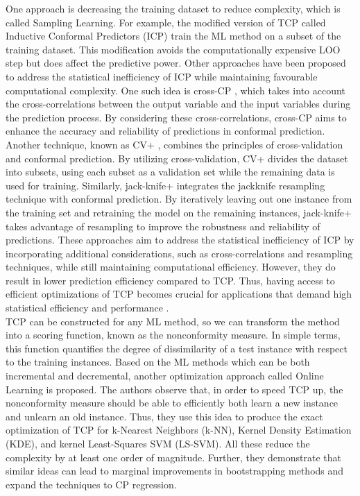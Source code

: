 \documentclass[10pt]{reportMaster}
\begin{document}
\noindent One approach is decreasing the training dataset to reduce complexity, which is called Sampling Learning. For example, the modified version of TCP called Inductive Conformal Predictors (ICP) \cite{vovk2005algorithmic, papadopoulos2002inductive} train the ML method on a subset of the training dataset. This modification avoids the computationally expensive LOO step but does affect the predictive power. Other approaches have been proposed to address the statistical inefficiency of ICP while maintaining favourable computational complexity. One such idea is cross-CP \cite{vovk2015cross}, which takes into account the cross-correlations between the output variable and the input variables during the prediction process. By considering these cross-correlations, cross-CP aims to enhance the accuracy and reliability of predictions in conformal prediction. Another technique, known as CV+ \cite{barber2021predictive}, combines the principles of cross-validation and conformal prediction. By utilizing cross-validation, CV+ divides the dataset into subsets, using each subset as a validation set while the remaining data is used for training. Similarly, jack-knife+ \cite{barber2021predictive} integrates the jackknife resampling technique with conformal prediction. By iteratively leaving out one instance from the training set and retraining the model on the remaining instances, jack-knife+ takes advantage of resampling to improve the robustness and reliability of predictions. These approaches aim to address the statistical inefficiency of ICP by incorporating additional considerations, such as cross-correlations and resampling techniques, while still maintaining computational efficiency. However, they do result in lower prediction efficiency compared to TCP. Thus, having access to efficient optimizations of TCP becomes crucial for applications that demand high statistical efficiency and performance \cite{lei2019fast}.\\

\noindent TCP can be constructed for any ML method, so we can transform the method into a scoring function, known as the nonconformity measure. In simple terms, this function quantifies the degree of dissimilarity of a test instance with respect to the training instances. Based on the ML methods which can be both incremental and decremental, another optimization approach called Online Learning is proposed. The authors \cite{cherubin2021exact} observe that, in order to speed TCP up, the nonconformity measure should be able to efficiently both learn a new instance and unlearn an old instance. Thus, they use this idea to produce the exact optimization of TCP for  k-Nearest Neighbors (k-NN), Kernel Density Estimation (KDE), and kernel Least-Squares SVM (LS-SVM). All these reduce the complexity by at least one order of magnitude. Further, they demonstrate that similar ideas can lead to marginal improvements in bootstrapping methods and expand the techniques to CP regression. 
\end{document}
